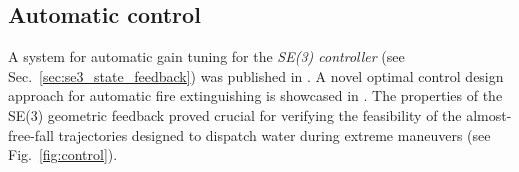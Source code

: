 \documentclass[a4paper,11pt,titlepage,twoside]{book}
\newcommand{\reffig}[1]{Fig.~\ref{#1}}
\newcommand{\refsec}[1]{Sec.~\ref{#1}}
\begin{document}
  \subsection{Automatic control}

  A system for automatic gain tuning for the \emph{SE(3) controller} (see \refsec{sec:se3_state_feedback}) was published in \cite{giernacky2019realtime}.
  A novel optimal control design approach for automatic fire extinguishing is showcased in \cite{saikin2020wildfire}.
  The properties of the SE(3) geometric feedback proved crucial for verifying the feasibility of the almost-free-fall trajectories designed to dispatch water during extreme maneuvers (see \reffig{fig:control}).

  \begin{figure}
    \centering
    \hfill%
\end{figure}
\end{document}
